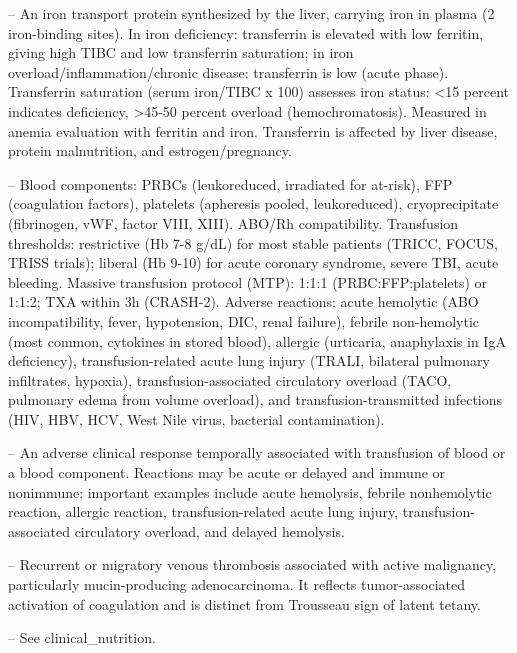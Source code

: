 -- An iron transport protein synthesized by the liver, carrying iron in plasma (2 iron-binding sites). In iron deficiency: transferrin is elevated with low ferritin, giving high TIBC and low transferrin saturation; in iron overload/inflammation/chronic disease: transferrin is low (acute phase). Transferrin saturation (serum iron/TIBC x 100) assesses iron status: <15 percent indicates deficiency, >45-50 percent overload (hemochromatosis). Measured in anemia evaluation with ferritin and iron. Transferrin is affected by liver disease, protein malnutrition, and estrogen/pregnancy.

-- Blood components: PRBCs (leukoreduced, irradiated for at-risk), FFP (coagulation factors), platelets (apheresis pooled, leukoreduced), cryoprecipitate (fibrinogen, vWF, factor VIII, XIII). ABO/Rh compatibility. Transfusion thresholds: restrictive (Hb 7-8 g/dL) for most stable patients (TRICC, FOCUS, TRISS trials); liberal (Hb 9-10) for acute coronary syndrome, severe TBI, acute bleeding. Massive transfusion protocol (MTP): 1:1:1 (PRBC:FFP:platelets) or 1:1:2; TXA within 3h (CRASH-2). Adverse reactions: acute hemolytic (ABO incompatibility, fever, hypotension, DIC, renal failure), febrile non-hemolytic (most common, cytokines in stored blood), allergic (urticaria, anaphylaxis in IgA deficiency), transfusion-related acute lung injury (TRALI, bilateral pulmonary infiltrates, hypoxia), transfusion-associated circulatory overload (TACO, pulmonary edema from volume overload), and transfusion-transmitted infections (HIV, HBV, HCV, West Nile virus, bacterial contamination).

-- An adverse clinical response temporally associated with transfusion of blood or a blood component. Reactions may be acute or delayed and immune or nonimmune; important examples include acute hemolysis, febrile nonhemolytic reaction, allergic reaction, transfusion-related acute lung injury, transfusion-associated circulatory overload, and delayed hemolysis.

-- Recurrent or migratory venous thrombosis associated with active malignancy, particularly mucin-producing adenocarcinoma. It reflects tumor-associated activation of coagulation and is distinct from Trousseau sign of latent tetany.

-- See clinical\_nutrition.

